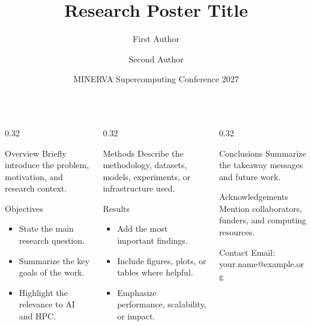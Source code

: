 \documentclass[final]{beamer}
\title{Research Poster Title}
\author{First Author \and Second Author}
\institute{Affiliation 1 \and Affiliation 2}
\date{MINERVA Supercomputing Conference 2027}
\begin{document}
\begin{frame}[t]
\begin{columns}[t,totalwidth=\textwidth]

\begin{column}{0.32\textwidth}
\begin{block}{Overview}
Briefly introduce the problem, motivation, and research context.
\end{block}

\begin{block}{Objectives}
\begin{itemize}
    \item State the main research question.
    \item Summarize the key goals of the work.
    \item Highlight the relevance to AI and HPC.
\end{itemize}
\end{block}
\end{column}

\begin{column}{0.32\textwidth}
\begin{block}{Methods}
Describe the methodology, datasets, models, experiments, or infrastructure used.
\end{block}

\begin{block}{Results}
\begin{itemize}
    \item Add the most important findings.
    \item Include figures, plots, or tables where helpful.
    \item Emphasize performance, scalability, or impact.
\end{itemize}
\end{block}
\end{column}

\begin{column}{0.32\textwidth}
\begin{block}{Conclusions}
Summarize the takeaway messages and future work.
\end{block}

\begin{block}{Acknowledgements}
Mention collaborators, funders, and computing resources.
\end{block}

\begin{block}{Contact}
Email: your.name@example.org
\end{block}
\end{column}

\end{columns}
\end{frame}
\end{document}
